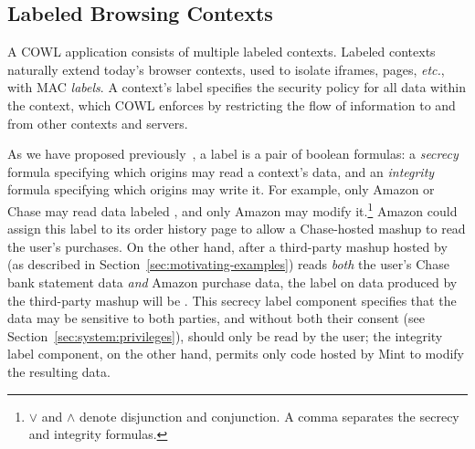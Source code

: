 \subsection{Labeled Browsing Contexts}
\label{sec:system:contexts}
A COWL application consists of multiple labeled contexts.
%
Labeled contexts naturally extend today's browser contexts, used to
isolate iframes, pages, \emph{etc.}, with MAC \emph{labels}.
%
A context's label specifies the security policy for all data within
the context, which COWL enforces by restricting the flow of
information to and from other contexts and servers.

As we have proposed previously~\cite{yang:2013:towards,
  stefan:2011:dclabels}, a label is a pair of boolean formulas: a
\emph{secrecy} formula specifying which origins may read a context's
data, and an \emph{integrity} formula specifying which origins may
write it.
%
For example, only Amazon or Chase may read data labeled
, and only Amazon may modify
it.\footnote{$\lor$ and $\land$ denote disjunction and conjunction. A
  comma separates the secrecy and integrity formulas.}
%
Amazon could assign this label to its order history page to allow a
Chase-hosted mashup to read the user's purchases.
%
On the other hand, after a third-party mashup hosted by
 (as described in
Section~\ref{sec:motivating-examples}) reads {\em both} the user's
Chase bank statement data {\em and} Amazon purchase data, the label on
data produced by the third-party mashup will be
.
%
This secrecy label component specifies that the data may be sensitive
to both parties, and without both their consent (see
Section~\ref{sec:system:privileges}), should only be read by the user;
the integrity label component, on the other hand, permits only code
hosted by Mint to modify the resulting data.
 

